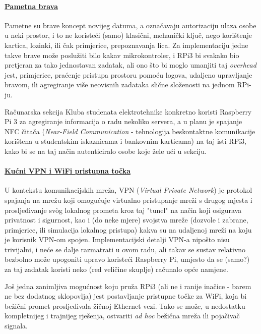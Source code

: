 \documentclass[12pt,a4paper]{article}
\begin{document}
	\paragraph{\underline{Pametna brava}} %
	\label{par:smart_lock}
		Pametne su brave koncept novijeg datuma, a označavaju autorizaciju ulaza osobe u neki prostor, i to ne koristeći (samo) klasični, mehanički ključ, nego korištenje kartica, lozinki, ili čak primjerice, prepoznavanja lica. Za implementaciju jedne takve brave može poslužiti bilo kakav mikrokontroler, i RPi3 bi svakako bio pretjeran za tako jednostavan zadatak, ali ono što bi moglo umanjiti taj \textit{overhead} jest, primjerice, praćenje pristupa prostoru pomoću logova, udaljeno upravljanje bravom, ili agregiranje više neovisnih zadataka slične složenosti na jednom RPi-ju.
		\par Računarska sekcija Kluba studenata elektrotehnike konkretno koristi Raspberry Pi 3 za agregiranje informacija o radu nekoliko servera, a u planu je spajanje NFC čitača (\textit{Near-Field Communication} - tehnologija beskontaktne komunikacije korištena u studentskim iskaznicama i bankovnim karticama) na taj isti RPi3, kako bi se na taj način autenticiralo osobe koje žele ući u sekciju.


	\paragraph{\underline{Kućni VPN i WiFi pristupna točka}} %
	\label{par:home_vpn}
		U kontekstu komunikacijskih mreža, VPN (\textit{Virtual Private Network}) je protokol spajanja na mrežu koji omogućuje virtualno pristupanje mreži s drugog mjesta i prosljeđivanje svòg lokalnog prometa kroz taj "tunel" na način koji osigurava privatnost i sigurnost, kao i (do neke mjere) svojstva mreže (dozvole i zabrane, primjerice, ili simulacija lokalnog pristupa) kakva su na udaljenoj mreži na koju je korisnik VPN-om spojen. Implementacijski detalji VPN-a nipošto nisu trivijalni, i neće se dalje razmatrati u ovom radu, ali takav se sustav relativno bezbolno može upogoniti upravo koristeći Raspberry Pi, umjesto da se (samo?) za taj zadatak koristi neko (red veličine skuplje) računalo opće namjene.
		\par Još jedna zanimljiva mogućnost koju pruža RPi3 (ali ne i ranije inačice - barem ne bez dodatnog sklopovlja) jest postavljanje pristupne točke za WiFi, koja bi bežični promet prosljeđivala žičnoj Ethernet vezi. Tako se može, u nedostatku kompletnijeg i trajnijeg rješenja, ostvariti \textit{ad hoc} bežična mreža ili pojačivač signala.
\end{document}
